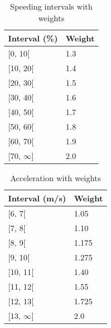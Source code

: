 \begin{table}
    \centering
    \begin{tabular}{|ll|}
    \hline
    \rowcolor{tablegreen}
    \textbf{Interval (\%)}   & \textbf{Weight} \\ \hline
    {[}0, 10{[}        & 1.3                   \\
    {[}10, 20{[}       & 1.4                   \\
    {[}20, 30{[}       & 1.5                   \\
    {[}30, 40{[}       & 1.6                   \\
    {[}40, 50{[}       & 1.7                   \\
    {[}50, 60{[}       & 1.8                   \\
    {[}60, 70{[}       & 1.9                   \\
    {[}70, $\infty${]} & 2.0                   \\ \hline
    \end{tabular}
    \caption{Speeding intervals with weights}
    \label{tab:speedingvalues}
\end{table}

\begin{table}
    \centering
    \begin{tabular}{|ll|}
    \hline
    \rowcolor{tablegreen}
    \textbf{Interval (m/s)} & \textbf{Weight} \\ \hline
    {[}6, 7{[}              & 1.05             \\
    {[}7, 8{[}              & 1.10             \\
    {[}8, 9{[}              & 1.175             \\
    {[}9, 10{[}             & 1.275             \\
    {[}10, 11{[}            & 1.40            \\
    {[}11, 12{[}            & 1.55             \\
    {[}12, 13{[}            & 1.725             \\
    {[}13, $\infty${]}      & 2.0             \\ \hline
    \end{tabular}
    \caption{Acceleration with weights}
    \label{tab:accelerationvalues}
\end{table}


